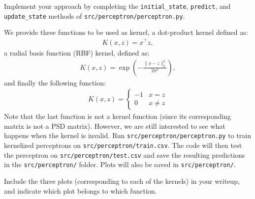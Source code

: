 \item {} Implement your approach by completing the
\texttt{initial\_state}, \texttt{predict}, and \texttt{update\_state} methods
of \texttt{src/perceptron/perceptron.py}.


We provide three functions to be used as kernel, a dot-product kernel defined as:
\begin{align}
	K(x,z) = x^\top z,
\end{align}
a
radial basis function (RBF) kernel, defined as:
\begin{align}
K(x,z) = \exp \left (-\frac{\|x-z\|_2^2}{2\sigma^2}\right), 
\end{align}
and finally the following function:
\begin{align}
K(x,z) = \begin{cases}
	 -1 & x=z \\
	 0 & x\neq z
	\end{cases}
\end{align}
\sloppy Note that the last function is not a kernel function (since its corresponding matrix is not a PSD matrix).
However, we are still interested to see what happens when the kernel is invalid.
%
 Run \texttt{src/perceptron/perceptron.py} to train
kernelized perceptrons on \texttt{src/perceptron/train.csv}. The code will then test
the perceptron on \texttt{src/perceptron/test.csv} and save the resulting
predictions in the \texttt{src/perceptron/} folder. Plots will also be saved in
\texttt{src/perceptron/}.


Include the three plots (corresponding to each of the kernels) in your writeup,
and indicate which plot belongs to which function.
